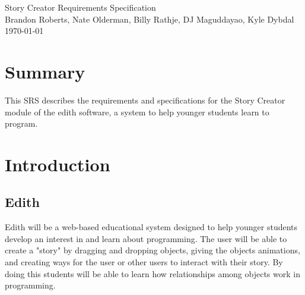 \documentclass[12pt]{article}
\begin{document}

\begin{titlepage}
	\vspace*{\fill} %
	\begin{center}
		{\Huge Story Creator Requirements Specification}\\ [0.5cm]	%
		{\Large Brandon Roberts, Nate Olderman, Billy Rathje, DJ Maguddayao, Kyle Dybdal}\\[0.4cm]
		\today %
	\end{center}
	\vspace*{\fill}
\end{titlepage}

\section{Summary}
This SRS describes the requirements and specifications for the Story Creator module of the edith software, a system to help younger students learn to program. 



\section{Introduction}%
	\subsection{Edith}
	Edith will be a web-based  educational system designed to help younger students develop an interest in and learn about programming. The user will be able to create a "story" by dragging and dropping objects, giving the objects animations, and creating ways for the user or other users to interact with their story. By doing this students will be able to learn how relationships among objects work in programming.
\end{document}
